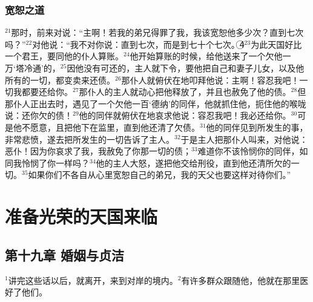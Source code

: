 \subsubsection{宽恕之道}
$^{21}$那时，\UL[伯多禄]前来对\UL[耶稣]说：“主啊！若我的弟兄得罪了我，我该宽恕他多少次？直到七次吗？”$^{22}$\UL[耶稣]对他说：“我不对你说：直到七次，而是到七十个七次。\textcircled{4}$^{23}$为此天国好比一个君王，要同他的仆人算账。$^{24}$他开始算账的时候，给他送来了一个欠他一万‘塔冷通’的，$^{25}$因他没有可还的，主人就下令，要他把自己和妻子儿女，以及他所有的一切，都变卖来还债。$^{26}$那仆人就俯伏在地叩拜他说：主啊！容忍我吧！一切我都要还给你。$^{27}$那仆人的主人就动心把他释放了，并且也赦免了他的债。$^{28}$但那仆人正出去时，遇见了一个欠他一百‘德纳’的同伴，他就抓住他，扼住他的喉咙说：还你欠的债！$^{29}$他的同伴就俯伏在地哀求他说：容忍我吧！我必还给你。$^{30}$可是他不愿意，且把他下在监里，直到他还清了欠债。$^{31}$他的同伴见到所发生的事，非常悲愤，遂去把所发生的一切告诉了主人。$^{32}$于是主人把那仆人叫来，对他说：恶仆！因为你哀求了我，我赦免了你那一切的债；$^{33}$难道你不该怜悯你的同伴，如同我怜悯了你一样吗？$^{34}$他的主人大怒，遂把他交给刑役，直到他还清所欠的一切。$^{35}$如果你们不各自从心里宽恕自己的弟兄，我的天父也要这样对待你们。”


\section{准备光荣的天国来临}


\subsection{第十九章 婚姻与贞洁}
$^{1}$\UL[耶稣]讲完这些话以后，就离开\UL[加里肋亚]，来到\UL[约但]对岸的\UL[犹太]境内。$^{2}$有许多群众跟随他，他就在那里医好了他们。

